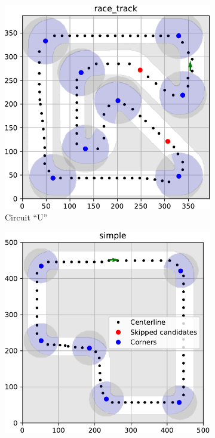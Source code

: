 \begin{figure}[]%
	\centering
	\begin{subfigure}[b]{0.49\textwidth}
		\centering
		\includegraphics[width=\textwidth]{../img/track-analysis/race_track}
		\caption{Circuit ``U''}
	\end{subfigure}
	\hfill
	\begin{subfigure}[b]{0.49\textwidth}%
	\centering
	\includegraphics[width=\textwidth]{../img/track-analysis/simple}

\end{subfigure}
\end{figure}
